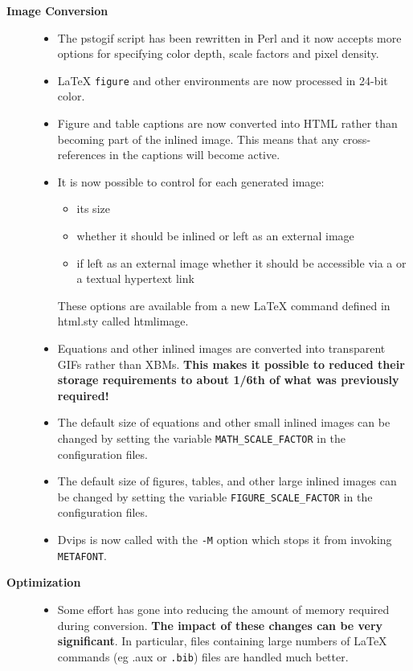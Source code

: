 \begin{description}
\item[{\bf Image Conversion}] \hfill
\begin{itemize}
\item The {\fn pstogif} script has been rewritten in Perl and it
now accepts more options for specifying color depth, scale factors
and pixel density.
\item LaTeX {\tt figure} and other environments are now processed
in 24-bit color.
\item Figure and table captions are now converted into HTML
rather than becoming part of the inlined image. This means that 
any cross-references in the captions will become active.
\item It is now possible to control for each generated image:
\begin{itemize}
\item its size 
\item whether it should be inlined or left as an external image
\item if left as an external image whether it should be accessible
via a 
or a textual hypertext link
\end{itemize}
These options are available from a new LaTeX command defined in {\fn
html.sty} called {\fn htmlimage}. 

\item Equations and other inlined images are converted into
transparent GIFs rather than XBMs. {\bf This makes it possible 
to reduced their storage requirements to about 1/6th of what was
previously required!}
\item The default size of equations and other small inlined 
images can be changed
by setting the variable {\tt MATH\_SCALE\_FACTOR} in the
configuration files.
\item The default size of figures, tables, and other large
inlined images can be changed by setting the variable 
{\tt FIGURE\_SCALE\_FACTOR} in the
configuration files.

\item Dvips is now called with the {\tt -M} option which stops it
from invoking {\tt METAFONT}.
\end{itemize}

\item[{\bf Optimization}] \hfill
\begin{itemize}
\item Some effort has gone into reducing the amount of memory required
during conversion. {\bf The impact of these changes can be very
significant}.
In particular, files
containing large numbers of LaTeX commands (eg {\fn .aux} or {\tt .bib}) 
files are handled much better.
\end{itemize}


\end{description}
